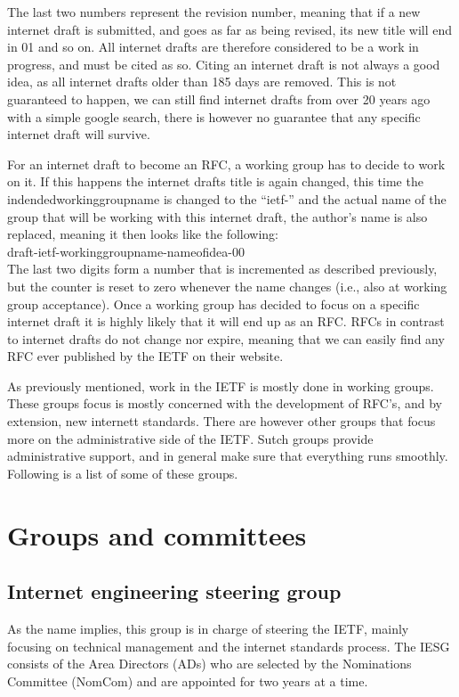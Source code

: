 \documentclass[a4paper,english]{report}
\begin{document}
The last two numbers represent the revision number, meaning that if a new internet draft is submitted, and goes as far as being revised, its new title will end in 01 and so on. All internet drafts are therefore considered to be a work in progress, and must be cited as so. Citing an internet draft is not always a good idea, as all internet drafts older than 185 days are removed. This is not guaranteed to  happen, we can still find internet drafts from over 20 years ago with a simple google search, there is however no guarantee that any specific internet draft will survive.

For an internet draft to become an RFC, a working group has to decide to work on it. If this happens the internet drafts title is again changed, this time the indendedworkinggroupname is changed to the “ietf-” and the actual name of the group that will be working with this internet draft, the author’s name is also replaced, meaning it then looks like the following: \\
	
 	draft-ietf-workinggroupname-nameofidea-00\\

The last two digits form a number that is incremented as described previously, but the counter is reset to zero whenever the name changes (i.e., also at working group acceptance). Once a working group has decided to focus on a specific internet draft it is highly likely that it will end up as an RFC. RFCs in contrast to internet drafts do not change nor expire, meaning that we can easily find any RFC ever published by the IETF on their website.


As previously mentioned, work in the IETF is mostly done in working groups. These groups focus is mostly concerned with the development of RFC’s, and by extension, new internett standards. There are however other groups that focus more on the administrative side of the IETF. Sutch groups provide administrative support, and in general make sure that everything runs smoothly.
Following is a list of some of these groups.

\section{Groups and committees}

\subsection{Internet engineering steering group}
As the name implies, this group is in charge of steering the IETF, mainly focusing on technical management and the internet standards process. The IESG consists of the Area Directors (ADs) who are selected by the Nominations Committee (NomCom) and are appointed for two years at a time.
\end{document}
